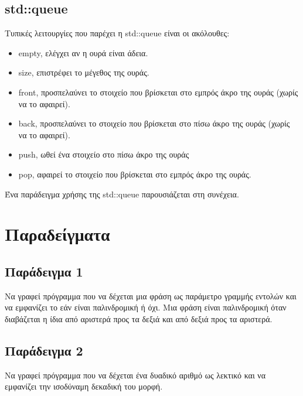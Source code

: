 


\subsection{std::queue}
Τυπικές λειτουργίες που παρέχει η std::queue είναι οι ακόλουθες:
\begin{itemize}[noitemsep]
\item empty, ελέγχει αν η ουρά είναι άδεια.
\item size, επιστρέφει το μέγεθος της ουράς.
\item front, προσπελαύνει το στοιχείο που βρίσκεται στο εμπρός άκρο της ουράς (χωρίς να το αφαιρεί).
\item back, προσπελαύνει το στοιχείο που βρίσκεται στο πίσω άκρο της ουράς (χωρίς να το αφαιρεί).
\item push, ωθεί ένα στοιχείο στο πίσω άκρο της ουράς
\item pop, αφαιρεί το στοιχείο που βρίσκεται στο εμπρός άκρο της ουράς.
\end{itemize}

Ένα παράδειγμα χρήσης της std::queue παρουσιάζεται στη συνέχεια.




\section{Παραδείγματα}
\subsection{Παράδειγμα 1}
Να γραφεί πρόγραμμα που να δέχεται μια φράση ως παράμετρο γραμμής εντολών και να εμφανίζει το εάν είναι παλινδρομική ή όχι. Μια φράση είναι παλινδρομική όταν διαβάζεται η ίδια από αριστερά προς τα δεξιά και από δεξιά προς τα αριστερά.




\subsection{Παράδειγμα 2}
Να γραφεί πρόγραμμα που να δέχεται ένα δυαδικό αριθμό ως λεκτικό και να εμφανίζει την ισοδύναμη δεκαδική του μορφή.


